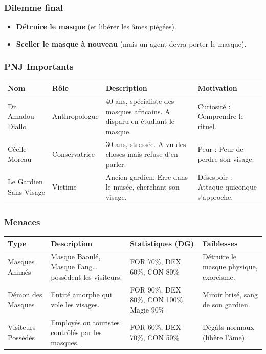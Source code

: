 \documentclass[10pt,a5paper,twoside]{book}
\begin{document}
\subsubsection*{Dilemme final}
\begin{itemize}
	\item \textbf{Détruire le masque} (et libérer les âmes piégées).
	\item \textbf{Sceller le masque à nouveau} (mais un agent devra porter le masque).
\end{itemize}

\newpage

\subsubsection*{PNJ Importants}
\begin{center}
	\begin{tabular}{|P{2cm}|P{3cm}|P{3.5cm}|P{2.5cm}|}
	\hline
	\textbf{Nom} 			& \textbf{Rôle} 	& \textbf{Description} 															& \textbf{Motivation} \\ \hline
	Dr. Amadou Diallo 		& Anthropologue		& 40 ans, spécialiste des masques africains. A disparu en étudiant le masque. 	& Curiosité : Comprendre le rituel. \\ \hline
	Cécile Moreau 			& Conservatrice 	& 30 ans, stressée. A vu des choses mais refuse d'en parler. 					& Peur : Peur de perdre son visage. \\ \hline
	Le Gardien Sans Visage 	& Victime 			& Ancien gardien. Erre dans le musée, cherchant son visage. 					& Désespoir : Attaque quiconque s'approche. \\ \hline
	\end{tabular}
\end{center}

\subsubsection*{Menaces}
\begin{center}
	\begin{tabular}{|P{2cm}|P{3cm}|P{3.5cm}|P{2.5cm}|}
	\hline
	\textbf{Type} 		& \textbf{Description} 									& \textbf{Statistiques (DG)} 					& \textbf{Faiblesses} \\ \hline
	Masques Animés 		& Masque Baoulé, Masque Fang\ldots~  possèdent les visiteurs. 	& FOR 70\%, DEX 60\%, CON 80\% 					& Détruire le masque physique, exorcisme. \\ \hline
	Démon des Masques 	& Entité amorphe qui vole les visages. 					& FOR 90\%, DEX 80\%, CON 100\%, Magie 90\% 	& Miroir brisé, sang de son gardien. \\ \hline
	Visiteurs Possédés 	& Employés ou touristes contrôlés par les masques. 		& FOR 60\%, DEX 70\%, CON 50\% 					& Dégâts normaux (libère l'âme). \\ \hline
	\end{tabular}
\end{center}
\end{document}
